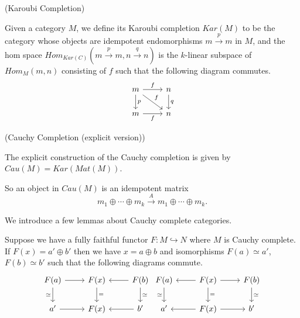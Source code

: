 \begin{definition} (Karoubi Completion)

  \noindent Given a category $M$, we define its Karoubi completion $Kar(M)$ to
  be the category whose objects are idempotent endomorphisms $m
  \xrightarrow{p} m$ in $M$, and the hom space $Hom_{Kar(C)}(m \xrightarrow{p}
  m, n \xrightarrow{q} n)$ is the $k$-linear subspace of $Hom_{M}(m,n)$
  consisting of $f$ such that the following diagram commutes.
  \[
    \begin{tikzcd}
    m & n \\
    m & n
    \arrow["f", from=1-1, to=1-2]
    \arrow["p", from=1-1, to=2-1]
    \arrow["f", from=1-1, to=2-2]
    \arrow["q", from=1-2, to=2-2]
    \arrow["f"', from=2-1, to=2-2]
    \end{tikzcd}
  \]
\end{definition}

\begin{definition} \label{definition/cauchy-completion/explicit} (Cauchy Completion (explicit version))

  \noindent The explicit construction of the Cauchy completion is given by
  $Cau(M)=Kar(Mat(M))$.
\end{definition}

\noindent So an object in $Cau(M)$ is an idempotent
matrix $$m_1\oplus\cdots\oplus m_k \xrightarrow{A} m_1\oplus\cdots\oplus
m_k.$$

\noindent We introduce a few lemmas about Cauchy complete categories.

\begin{lemma} \label{direct_sum}
  Suppose we have a fully faithful functor $F:M\hookrightarrow N$ where $M$ is
  Cauchy complete. If $F(x)=a'\oplus b'$ then we have $x=a\oplus b$ and
  isomorphisms $F(a)\simeq a'$, $F(b)\simeq b'$ such that the following
  diagrams commute.
  \[
    \begin{tikzcd}
      {F(a)} & {F(x)} & {F(b)} \\
      {a'} & {F(x)} & {b'}
      \arrow[from=1-1, to=1-2]
      \arrow["\simeq"', from=1-1, to=2-1]
      \arrow["{=}", from=1-2, to=2-2]
      \arrow[from=1-3, to=1-2]
      \arrow["\simeq", from=1-3, to=2-3]
      \arrow[from=2-1, to=2-2]
      \arrow[from=2-3, to=2-2]
    \end{tikzcd} \begin{tikzcd}
      {F(a)} & {F(x)} & {F(b)} \\
      {a'} & {F(x)} & {b'}
      \arrow["\simeq"', from=1-1, to=2-1]
      \arrow[from=1-2, to=1-1]
      \arrow[from=1-2, to=1-3]
      \arrow["{=}", from=1-2, to=2-2]
      \arrow["\simeq", from=1-3, to=2-3]
      \arrow[from=2-2, to=2-1]
      \arrow[from=2-2, to=2-3]
    \end{tikzcd}
  \]
\end{lemma}

